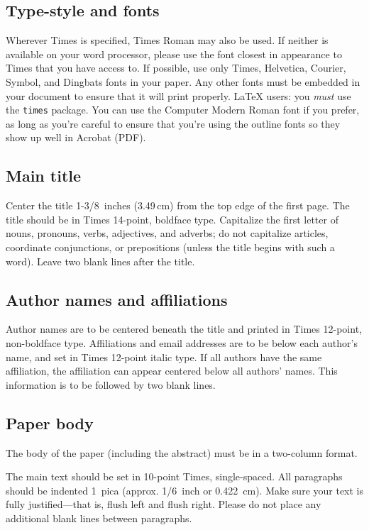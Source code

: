 \documentclass[10pt,twocolumn]{article}
\newcommand{\latex}{\LaTeX\xspace}
\begin{document}
\subsection{Type-style and fonts}

Wherever Times is specified, Times Roman may also be used. If neither
is available on your word processor, please use the font closest in
appearance to Times that you have access to.  If possible, use only
Times, Helvetica, Courier, Symbol, and Dingbats fonts in your paper.
Any other fonts must be embedded in your document to ensure that it
will print properly.  \latex users: you \emph{must} use the
\texttt{times} package.  You can use the Computer Modern Roman font
if you prefer, as long as you're careful to ensure that you're using
the outline fonts so they show up well in Acrobat (PDF).

\subsection{Main title}

Center the title 1-3/8~inches (3.49\,cm) from the top edge of the
first page. The title should be in Times 14-point, boldface type.
Capitalize the first letter of nouns, pronouns, verbs, adjectives, and
adverbs; do not capitalize articles, coordinate conjunctions, or
prepositions (unless the title begins with such a word). Leave two
blank lines after the title.

\subsection{Author names and affiliations}

Author names are to be centered beneath the title and printed in Times
12-point, non-boldface type.  Affiliations and email addresses are to
be below each author's name, and set in Times 12-point italic type.
If all authors have the same affiliation, the affiliation can appear
centered below all authors' names.
This information is to be followed by two blank lines.

\subsection{Paper body}

The body of the paper (including the abstract) must be in a two-column
format.

The main text should be set in 10-point Times, single-spaced.  All
paragraphs should be indented 1~pica (approx. 1/6~inch or
0.422~cm). Make sure your text is fully justified---that is, flush
left and flush right. Please do not place any additional blank lines
between paragraphs.
\end{document}
